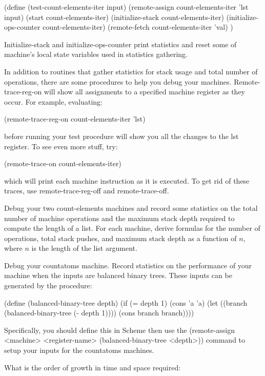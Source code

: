 \beginlisp
(define (test-count-elements-iter input)
  (remote-assign count-elements-iter 'lst input)
  (start count-elements-iter)
  (initialize-stack count-elements-iter)
  (initialize-ops-counter count-elements-iter)
  (remote-fetch count-elements-iter 'val)
  )
\endlisp

{\cf Initialize-stack} and {\cf initialize-ops-counter} print
statistics and reset some of machine's local state variables used in
statistics gathering.

In addition to routines that gather statistics for stack usage and
total number of operations, there are some procedures to help you
debug your machines.  {\cf Remote-trace-reg-on} will show all
assignments to a specified machine register as they occur.  For
example, evaluating:

\beginlisp
(remote-trace-reg-on count-elements-iter 'lst)
\endlisp

before running your test procedure will show you all the changes to the
{\cf lst} register. To see even more stuff, try:

\beginlisp
(remote-trace-on count-elements-iter)
\endlisp

which will print each machine instruction as it is executed.  To get rid
of these traces, use {\cf remote-trace-reg-off} and {\cf
remote-trace-off}.

  Debug your two {\cf count-elements} machines and
record some statistics on the total number of machine operations and the maximum
stack depth required to compute the length of a list.  For each machine, derive
formulas for the number of operations, total stack pushes, and maximum
stack depth as a function of $n$, where $n$ is the length of the list
argument.

 Debug your {\cf countatoms} machine.  Record
statistics on the performance of your machine when the inputs are
balanced binary trees.  These inputs can be generated by the procedure:

\beginlisp
(define (balanced-binary-tree depth)
  (if (= depth 1)
      (cons 'a 'a)
      (let ((branch (balanced-binary-tree (- depth 1))))
        (cons branch branch))))
\endlisp

Specifically, you should define this in {\sc Scheme} then use the
{\cf (remote-assign <machine> <register-name> (balanced-binary-tree <depth>))}
command to setup your inputs for the {\cf countatoms} machines.

What is the order of growth in time and space required:

